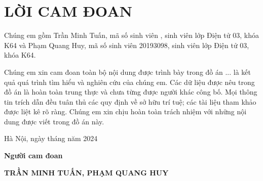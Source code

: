 \section*{LỜI CAM ĐOAN} %
\thispagestyle{empty}

Chúng em gồm Trần Minh Tuấn, mã số sinh viên , sinh viên lớp Điện tử 03, khóa K64 và Phạm Quang Huy, mã số sinh viên 20193098, sinh viên lớp Điện tử 03, khóa K64.

Chúng em xin cam đoan toàn bộ nội dung được trình bày trong đồ án ... là kết quả quá trình tìm hiểu và
nghiên cứu của chúng em. Các dữ liệu được nêu trong đồ án là hoàn toàn trung thực
và chưa từng được người khác công bố. Mọi thông tin trích dẫn đều tuân thủ các quy
định về sở hữu trí tuệ; các tài liệu tham khảo được liệt kê rõ ràng. Chúng em xin
chịu hoàn toàn trách nhiệm với những nội dung được viết trong đồ án này.


\vspace{6pt}

\hspace{8cm}Hà Nội, ngày  tháng  năm 2024

\hspace{9cm}\textbf{Người cam đoan}

\vspace{1cm}
\hspace{7cm}\textbf{TRẦN MINH TUẤN,  PHẠM QUANG HUY}

\cleardoublepage